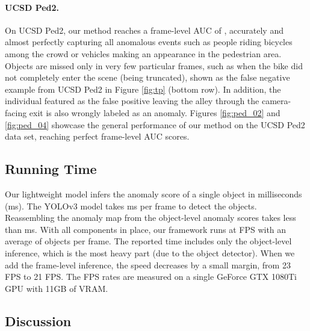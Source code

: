 \documentclass[final]{cvpr}
\begin{document}
\paragraph{UCSD Ped2.} On UCSD Ped2, our method reaches a frame-level AUC of , accurately and almost perfectly capturing all anomalous events such as people riding bicycles among the crowd or vehicles making an appearance in the pedestrian area. Objects are missed only in very few particular frames, such as when the bike did not completely enter the scene (being truncated), shown as the false negative example from UCSD Ped2 in Figure \ref{fig:tp} (bottom row). In addition, the individual featured as the false positive leaving the alley through the camera-facing exit is also wrongly labeled as an anomaly. Figures \ref{fig:ped_02} and \ref{fig:ped_04} showcase the general performance of our method on the UCSD Ped2 data set, reaching perfect frame-level AUC scores.

\subsection{Running Time}

Our lightweight model infers the anomaly score of a single object in  milliseconds (ms). The YOLOv3 model takes  ms per frame to detect the objects. Reassembling the anomaly map from the object-level anomaly scores takes less than  ms. With all components in place, our framework runs at  FPS with an average of  objects per frame. The reported time includes only the object-level inference, which is the most heavy part (due to the object detector). When we add the frame-level inference, the speed decreases by a small margin, from 23 FPS to 21 FPS. The FPS rates are measured on a single GeForce GTX 1080Ti GPU with 11GB of VRAM.

\subsection{Discussion}
\end{document}
